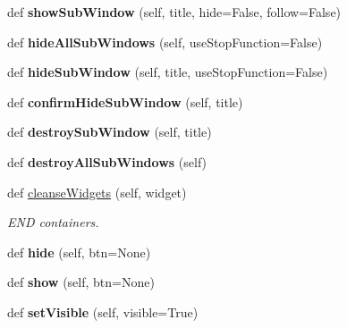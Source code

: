 \begin{DoxyCompactItemize}
def {\bfseries show\+Sub\+Window} (self, title, hide=False, follow=False)
\item 
\mbox{\label{classappjar_1_1gui_a13f1897489bd4d2edcc350991ff63043}} 
def {\bfseries hide\+All\+Sub\+Windows} (self, use\+Stop\+Function=False)
\item 
\mbox{\label{classappjar_1_1gui_a65c6930bf980d3a6e06e732b726935da}} 
def {\bfseries hide\+Sub\+Window} (self, title, use\+Stop\+Function=False)
\item 
\mbox{\label{classappjar_1_1gui_aa4b213971cdd347f2b91376462f999d5}} 
def {\bfseries confirm\+Hide\+Sub\+Window} (self, title)
\item 
\mbox{\label{classappjar_1_1gui_a7ff8ceea4c3ced112313694b591fed82}} 
def {\bfseries destroy\+Sub\+Window} (self, title)
\item 
\mbox{\label{classappjar_1_1gui_ad37d65e95c035d4a1af5e2f8aaf12fbe}} 
def {\bfseries destroy\+All\+Sub\+Windows} (self)
\item 
\mbox{\label{classappjar_1_1gui_a3b5fc1306d54bd6c56674e9dad1c2319}} 
def \hyperlink{classappjar_1_1gui_a3b5fc1306d54bd6c56674e9dad1c2319}{cleanse\+Widgets} (self, widget)
\begin{DoxyCompactList}\small\item\em E\+ND containers. \end{DoxyCompactList}\item 
\mbox{\label{classappjar_1_1gui_a91e23478632d9a13e59a5f84e8c0ced3}} 
def {\bfseries hide} (self, btn=None)
\item 
\mbox{\label{classappjar_1_1gui_a3615e53cb1078004610340f5e358a090}} 
def {\bfseries show} (self, btn=None)
\item 
\mbox{\label{classappjar_1_1gui_a336124366431b6c4b5232d19326aafd7}} 
def {\bfseries set\+Visible} (self, visible=True)
\item 
\mbox{\label{classappjar_1_1gui_a7cc88afb51ead5a803bbc8e3f475321b}} 

\end{DoxyCompactItemize}
